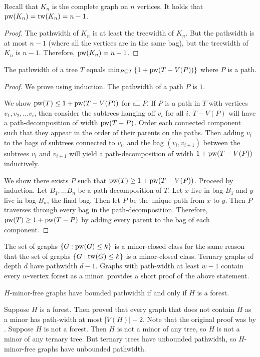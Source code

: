 \begin{example}
	Recall that $K_n$ is the complete graph on $n$ vertices. It holds that \(\operatorname{pw}(K_n) = \operatorname{tw}(K_n) = n - 1\).
\end{example}
\begin{proof}
	The pathwidth of \(K_n\) is at least the treewidth of \(K_n\). But the pathwidth is at most \(n- 1\) (where all the vertices are in the same bag), but the treewidth of \(K_n\) is \(n - 1\). Therefore, \(\operatorname{pw}(K_n) = n - 1\).
\end{proof}

\begin{proposition}
	The pathwidth of a tree \(T\) equals \(\min_{P \subseteq T} \left\lbrace 1 + \operatorname{pw}(T - V(P))\right\rbrace \) where \(P\) is a path.
\end{proposition}

\begin{proof}[Proof]
	We prove using induction. The pathwidth of a path $P$ is $1$.

	We show \(\operatorname{pw}(T) \leq 1 + \operatorname{pw}(T - V(P))\) for all $P$. If \(P\) is a path in \(T\) with vertices \(v_1, v_2, \ldots v_i\), then consider the subtrees hanging off \(v_i\) for all \(i\). \(T - V(P)\) will have a path-decomposition of width $\operatorname{pw}(T - P)$. Order each connected component such that they appear in the order of their parents on the paths. Then adding \(v_i\) to the bags of subtrees connected to \(v_i\), and the bag \((v_i, v_{i+1})\) between the subtrees \(v_i\) and \(v_{i + 1}\) will yield a path-decomposition of width \(1 + \operatorname{pw}(T - V(P))\) inductively.

	We show there exists $P$ such that \(\operatorname{pw}(T) \geq 1 + \operatorname{pw}(T - V(P))\). Proceed by induction. Let \(B_1, \ldots B_n\) be a path-decomposition of \(T\). Let \(x\) live in bag \(B_1\) and \(y\) live in bag \(B_n\), the final bag. Then let \(P\) be the unique path from \(x\) to \(y\). Then \(P\) traverses through every bag in the path-decomposition. Therefore, \(\operatorname{pw}(T) \geq 1 + \operatorname{pw}(T - P)\) by adding every parent to the bag of each component. 
\end{proof}

The set of graphs $\{G : \operatorname{pw}(G) \leq k\}$ is a minor-closed class for the same reason that the set of graphs $\{G : \operatorname{tw}(G) \leq k\}$ is a minor-closed class.
Ternary graphs of depth $d$ have pathwidth $d-1$. Graphs with path-width at least $w - 1$ contain every $w$-vertex forest as a minor. \textcite{seymourShorterProofPathwidth2023} provides a short proof of the above statement. 
\begin{theorem}
	$H$-minor-free graphs have bounded pathwidth if and only if $H$ is a forest. 
\end{theorem}

\begin{theorem}
	Suppose $H$ is a forest. Then \textcite{seymourShorterProofPathwidth2023} proved that every graph that does not contain $H$ as a minor has path-width at most $|V(H)| - 2$. Note that the original proof was by \textcite{robertsonGraphMinorsExcluding1983}. 
	Suppose $H$ is not a forest. Then $H$ is not a minor of any tree, so $H$ is not a minor of any ternary tree. But ternary trees have unbounded pathwidth, so $H$-minor-free graphs have unbounded pathwidth.
\end{theorem}
